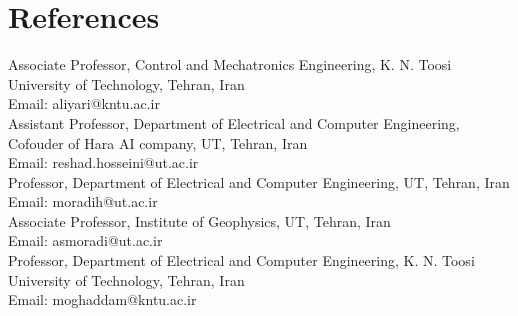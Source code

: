 \section{References}
  \vspace{2pt}
  \resumeSubHeadingListStart
    \small{\item{

        \textbf{}{ Associate Professor, Control and Mechatronics Engineering, K. N. Toosi University of Technology, Tehran, Iran\\Email: aliyari@kntu.ac.ir}\\ \vspace{3pt}
        \textbf{}{ Assistant Professor, Department of Electrical and Computer Engineering, Cofouder of Hara AI company, UT, Tehran, Iran\\Email: reshad.hosseini@ut.ac.ir}\\ \vspace{3pt}
        \textbf{}{ Professor, Department of Electrical and Computer Engineering, UT, Tehran, Iran\\Email: moradih@ut.ac.ir}\\ \vspace{3pt}
        \textbf{}{ Associate Professor, Institute of Geophysics, UT, Tehran, Iran\\Email: asmoradi@ut.ac.ir}\\ \vspace{3pt}
        \textbf{}{ Professor, Department of Electrical and Computer Engineering, K. N. Toosi University of Technology, Tehran, Iran\\Email: moghaddam@kntu.ac.ir}\\ \vspace{3pt}

}}
\resumeSubHeadingListEnd

